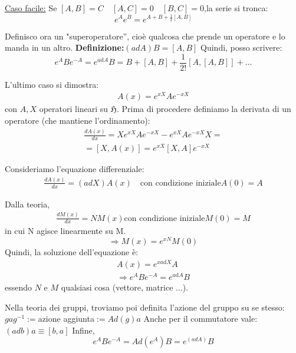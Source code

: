 \underline{Caso facile:} 
Se $\left[A,B\right]=C \quad \left[A,C\right]=0 \quad \left[B,C\right]=0$,la serie si tronca:
$$
e^Ae^B=e^{A+B+\frac{1}{2}\left[A,B\right]}
$$

Definisco ora un "superoperatore'', cioè qualcosa che prende un operatore e lo manda in un altro.
\textbf{Definizione:}$(adA)B=[A,B]$
Quindi, posso scrivere:
$$
e^ABe^{-A}=e^{a\textrm{d}A}B=B+\left[A,B\right]+\frac{1}{2!}\left[A,\left[A,B\right]\right]+\dots
$$

L'ultimo caso si dimostra:
\begin{equation*}\begin{split}
A\left(x\right)=e^{xX}Ae^{-xX}
\end{split}\end{equation*}
con $A,X$ operatori lineari su $\mathfrak{H}$.
Prima di procedere definiamo la derivata di un operatore (che mantiene l'ordinamento):
\begin{equation*}\begin{split}
\frac{dA\left(x\right)}{dx}=Xe^{xX}Ae^{-xX}-e^{xX}Ae^{-xX}X=\\
=\left[X,A\left(x\right)\right]=e^{xX}[X,A]e^{-xX}
\end{split}\end{equation*}

Consideriamo l'equazione differenziale:
\begin{equation*}\begin{split}
\frac{dA\left(x\right)}{dx}=\left(adX\right)A\left(x\right) \quad \textrm{con condizione iniziale} A\left(0\right)=A
\end{split}\end{equation*}

Dalla teoria,
\begin{equation*}\begin{split}
\frac{dM\left(x\right)}{dx}=NM\left(x\right) \textrm{con condizione iniziale}M(0)=M
\end{split}\end{equation*}
in cui N agisce linearmente su M.
$$
\Longrightarrow M(x)=e^{xN}M\left(0\right)
$$
Quindi, la soluzione dell'equazione è:
\begin{equation*}\begin{split}
A\left(x\right)=e^{xa\textrm{d}X}A \\
\Longrightarrow e^ABe^{-A}=e^{a\textrm{d}A}B
\end{split}\end{equation*}
essendo $N$ e $M$ qualsiasi cosa (vettore, matrice $\dots$).

Nella teoria dei gruppi, troviamo poi definita l'azione del gruppo su se stesso:
\\ $gag^{-1}:=$azione aggiunta$:=Ad(g)a$
Anche per il commutatore vale: $(adb)a\equiv[b,a]$
Infine,
\begin{equation*}
e^ABe^{-A}=Ad\left(e^A\right)B=e^(adA)B
\end{equation*}
%